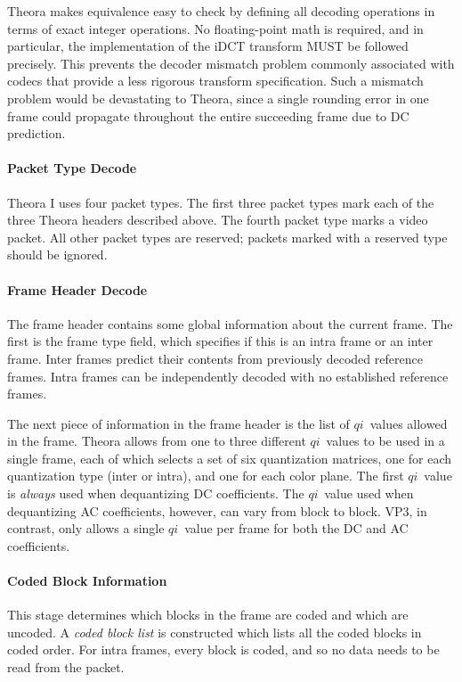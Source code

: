 \documentclass[11pt,letterpaper]{book}
\newcommand{\idx}[1]{{\ensuremath{\mathit{#1}}}}
\newcommand{\qi}{\idx{qi}}
\newcommand{\term}[1]{{\em #1}}
\numberwithin{equation}{chapter}
\numberwithin{figure}{chapter}
\numberwithin{table}{chapter}
\begin{document}
Theora makes equivalence easy to check by defining all decoding operations in
 terms of exact integer operations.
No floating-point math is required, and in particular, the implementation of
 the iDCT transform MUST be followed precisely.
This prevents the decoder mismatch problem commonly associated with codecs that
 provide a less rigorous transform specification.
Such a mismatch problem would be devastating to Theora, since a single rounding
 error in one frame could propagate throughout the entire succeeding frame due
 to DC prediction.

\paragraph{Packet Type Decode}

Theora I uses four packet types.
The first three packet types mark each of the three Theora headers described
 above.
The fourth packet type marks a video packet.
All other packet types are reserved; packets marked with a reserved type should
 be ignored.

\paragraph{Frame Header Decode}

The frame header contains some global information about the current frame.
The first is the frame type field, which specifies if this is an intra frame or
 an inter frame.
Inter frames predict their contents from previously decoded reference frames.
Intra frames can be independently decoded with no established reference frames.

The next piece of information in the frame header is the list of \qi\ values
 allowed in the frame.
Theora allows from one to three different \qi\ values to be used in a single
 frame, each of which selects a set of six quantization matrices, one for each
 quantization type (inter or intra), and one for each color plane.
The first \qi\ value is {\em always} used when dequantizing DC coefficients.
The \qi\ value used when dequantizing AC coefficients, however, can vary from
 block to block.
VP3, in contrast, only allows a single \qi\ value per frame for both the DC and
 AC coefficients.

\paragraph{Coded Block Information}

This stage determines which blocks in the frame are coded and which are
 uncoded.
A \term{coded block list} is constructed which lists all the coded blocks in
 coded order.
For intra frames, every block is coded, and so no data needs to be read from
 the packet.
\end{document}
